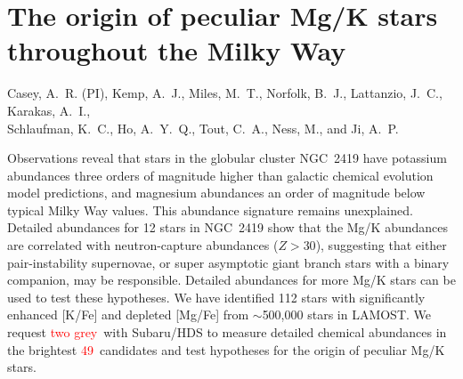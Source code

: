 \documentclass[12pt]{report}
\newcommand{\todo}[1]{\textcolor{red}{#1}}
\newcommand{\NumStars}{\todo{49}}
\newcommand{\NumNights}{\todo{two grey}}
\begin{document}
\section*{The origin of peculiar Mg/K stars throughout the Milky Way}\vspace{-\parskip}

\begin{center}
Casey, A.~R. (PI), Kemp, A.~J., Miles, M.~T., Norfolk, B.~J., Lattanzio, J.~C., Karakas, A.~I.,\\ Schlaufman, K.~C., Ho, A.~Y.~Q., Tout, C.~A., Ness, M., and Ji, A.~P.
\end{center}

\newcommand{\refnum}[1]{[#1]}

\begin{highlightbox}
Observations reveal that stars in the globular cluster NGC~2419 have potassium abundances three orders of magnitude higher than galactic chemical evolution model predictions, and magnesium abundances an order of magnitude below typical Milky Way values. This abundance signature remains unexplained. Detailed abundances for 12 stars in NGC~2419 show that the Mg/K abundances are correlated with neutron-capture abundances ($Z > 30$), suggesting that either pair-instability supernovae, or super asymptotic giant branch stars with a binary companion, may be responsible. Detailed abundances for more Mg/K stars can be used to test these hypotheses. We have identified 112 stars with significantly enhanced [K/Fe] and depleted [Mg/Fe] from $\sim$500,000 stars in LAMOST. We request \NumNights\ with Subaru/HDS to measure detailed chemical abundances in the brightest \NumStars\ candidates and test hypotheses for the origin of peculiar Mg/K stars.
\end{highlightbox}\vspace{-\parskip}
\end{document}
